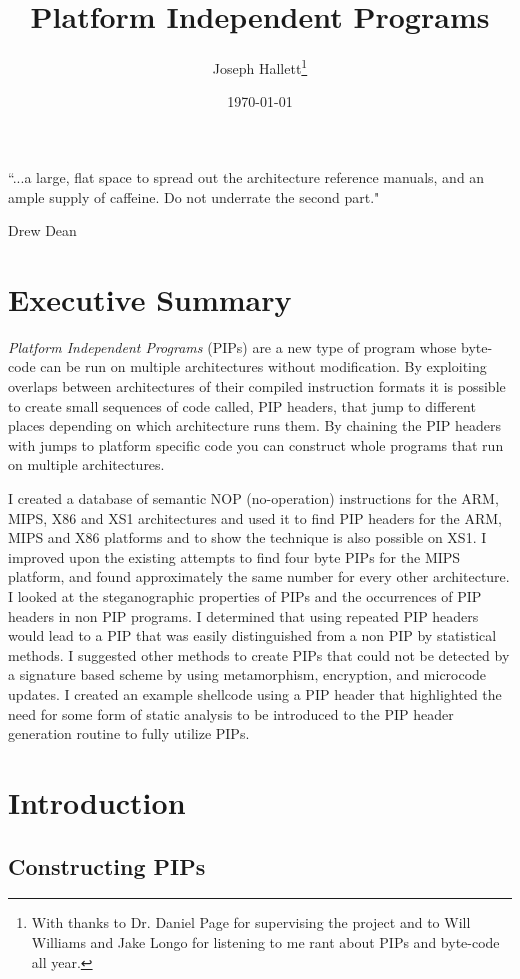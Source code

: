 \documentclass[10pt]{book}
\title{Platform Independent Programs}
\author{Joseph Hallett\thanks{With thanks to Dr. Daniel Page for supervising the project and to Will Williams and Jake Longo for listening to me rant about PIPs and byte-code all year.}}
\date{\today}
\begin{document}




\maketitle

\epigraph{\textsf{``{.}{.}{.}a large, flat space to spread out the architecture reference manuals, and an ample supply of caffeine. Do not underrate the second part."}}{\textsf{Drew Dean}}

\tableofcontents
\listoftables
\lstlistoflistings
\chapter{Executive Summary}

\emph{Platform Independent Programs} (PIPs) are a new type of program
whose byte-code can be run on multiple architectures without
modification. By exploiting overlaps between architectures of their
compiled instruction formats it is possible to create small sequences of
code called, PIP headers, that jump to different places depending on
which architecture runs them. By chaining the PIP headers with jumps to
platform specific code you can construct whole programs that run on
multiple architectures.

I created a database of semantic NOP (no-operation) instructions for the
ARM, MIPS, X86 and XS1 architectures and used it to find PIP headers for
the ARM, MIPS and X86 platforms and to show the technique is also
possible on XS1. I improved upon the existing attempts to find four byte
PIPs for the MIPS platform, and found approximately the same number for
every other architecture. I looked at the steganographic properties of
PIPs and the occurrences of PIP headers in non PIP programs. I
determined that using repeated PIP headers would lead to a PIP that was
easily distinguished from a non PIP by statistical methods. I suggested
other methods to create PIPs that could not be detected by a signature
based scheme by using metamorphism, encryption, and microcode updates. I
created an example shellcode using a PIP header that highlighted the
need for some form of static analysis to be introduced to the PIP header
generation routine to fully utilize PIPs.

\chapter{Introduction}

\section{Constructing PIPs}
\end{document}
